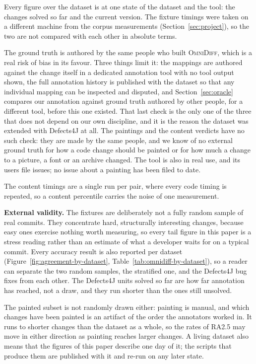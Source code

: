 \documentclass[sigconf,review]{acmart}
\begin{document}
Every figure over the dataset is at one state of the dataset and the tool: the \NumFixtures{}
changes solved so far and the current version. The fixture timings were taken on a different
machine from the corpus measurements (Section~\ref{sec:project}), so the two are not compared
with each other in absolute terms.

The ground truth is authored by the same people who built \textsc{OmniDiff}, which is a real risk
of bias in its favour. Three things limit it: the mappings are authored against the change itself
in a dedicated annotation tool with no tool output shown, the full annotation history is published
with the dataset so that any individual mapping can be inspected and disputed, and
Section~\ref{sec:oracle} compares our annotation against ground truth authored by other people,
for a different tool, before this one existed. That last check is the only one of the three that
does not depend on our own discipline, and it is the reason the dataset was extended with
Defects4J at all. The paintings and the content verdicts have no such check: they are made by the
same people, and we know of no external ground truth for how a code change should be painted or
for how much a change to a picture, a font or an archive changed. The tool is also in real use,
and its users file issues; no issue about a painting has been filed to date.

The content timings are a single run per pair, where every code timing is repeated, so a content
percentile carries the noise of one measurement.

\textbf{External validity.} The fixtures are deliberately not a fully random sample of real
commits. They concentrate hard, structurally interesting changes, because easy ones exercise
nothing worth measuring, so every tail figure in this paper is a stress reading rather than an
estimate of what a developer waits for on a typical commit. Every accuracy result is also
reported per dataset (Figure~\ref{fig:agreement-by-dataset},
Table~\ref{tab:omnidiff-by-dataset}), so a reader can separate the two random samples, the
stratified one, and the Defects4J bug fixes from each other. The Defects4J units solved so far
are how far annotation has reached, not a draw, and they run shorter than the ones still
unsolved.

The painted subset is not randomly drawn either: painting is manual, and which changes have been
painted is an artifact of the order the annotators worked in. It runs to shorter changes than the
dataset as a whole, so the rates of RA2.5 may move in either direction as painting
reaches larger changes. A living dataset also means that the figures of this paper describe one
day of it; the scripts that produce them are published with it and re-run on any later state.
\end{document}
